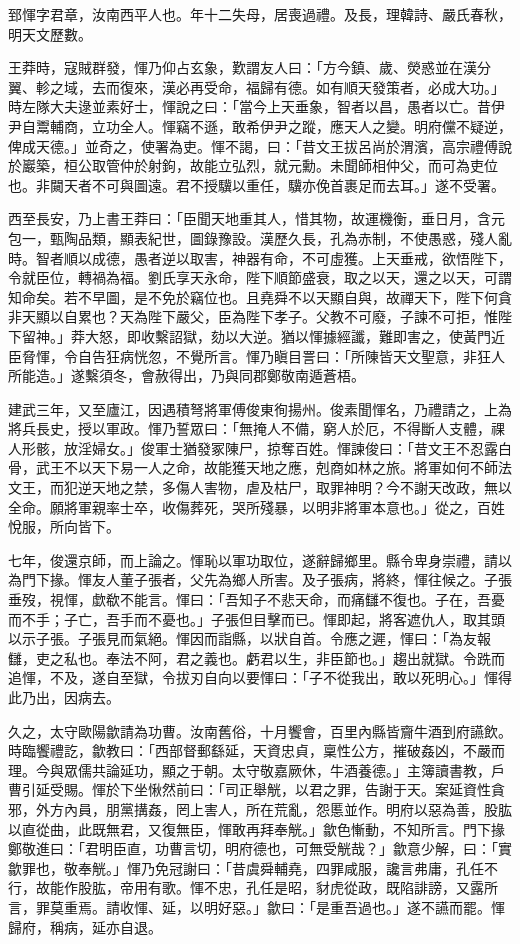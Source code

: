 \begin{pinyinscope}
郅惲字君章，汝南西平人也。年十二失母，居喪過禮。及長，理韓詩、嚴氏春秋，明天文歷數。

王莽時，寇賊群發，惲乃仰占玄象，歎謂友人曰：「方今鎮、歲、熒惑並在漢分翼、軫之域，去而復來，漢必再受命，福歸有德。如有順天發策者，必成大功。」時左隊大夫逯並素好士，惲說之曰：「當今上天垂象，智者以昌，愚者以亡。昔伊尹自鬻輔商，立功全人。惲竊不遜，敢希伊尹之蹤，應天人之變。明府儻不疑逆，俾成天德。」並奇之，使署為吏。惲不謁，曰：「昔文王拔呂尚於渭濱，高宗禮傅說於巖築，桓公取管仲於射鉤，故能立弘烈，就元勳。未聞師相仲父，而可為吏位也。非闚天者不可與圖遠。君不授驥以重任，驥亦俛首裹足而去耳。」遂不受署。

西至長安，乃上書王莽曰：「臣聞天地重其人，惜其物，故運機衡，垂日月，含元包一，甄陶品類，顯表紀世，圖錄豫設。漢歷久長，孔為赤制，不使愚惑，殘人亂時。智者順以成德，愚者逆以取害，神器有命，不可虛獲。上天垂戒，欲悟陛下，令就臣位，轉禍為福。劉氏享天永命，陛下順節盛衰，取之以天，還之以天，可謂知命矣。若不早圖，是不免於竊位也。且堯舜不以天顯自與，故禪天下，陛下何貪非天顯以自累也？天為陛下嚴父，臣為陛下孝子。父教不可廢，子諫不可拒，惟陛下留神。」莽大怒，即收繫詔獄，劾以大逆。猶以惲據經讖，難即害之，使黃門近臣脅惲，令自告狂病恍忽，不覺所言。惲乃瞋目詈曰：「所陳皆天文聖意，非狂人所能造。」遂繫須冬，會赦得出，乃與同郡鄭敬南遁蒼梧。

建武三年，又至廬江，因遇積弩將軍傅俊東徇揚州。俊素聞惲名，乃禮請之，上為將兵長史，授以軍政。惲乃誓眾曰：「無掩人不備，窮人於厄，不得斷人支體，祼人形骸，放淫婦女。」俊軍士猶發冢陳尸，掠奪百姓。惲諫俊曰：「昔文王不忍露白骨，武王不以天下易一人之命，故能獲天地之應，剋商如林之旅。將軍如何不師法文王，而犯逆天地之禁，多傷人害物，虐及枯尸，取罪神明？今不謝天改政，無以全命。願將軍親率士卒，收傷葬死，哭所殘暴，以明非將軍本意也。」從之，百姓悅服，所向皆下。

七年，俊還京師，而上論之。惲恥以軍功取位，遂辭歸鄉里。縣令卑身崇禮，請以為門下掾。惲友人董子張者，父先為鄉人所害。及子張病，將終，惲往候之。子張垂歿，視惲，歔欷不能言。惲曰：「吾知子不悲天命，而痛讎不復也。子在，吾憂而不手；子亡，吾手而不憂也。」子張但目擊而已。惲即起，將客遮仇人，取其頭以示子張。子張見而氣絕。惲因而詣縣，以狀自首。令應之遲，惲曰：「為友報讎，吏之私也。奉法不阿，君之義也。虧君以生，非臣節也。」趨出就獄。令跣而追惲，不及，遂自至獄，令拔刃自向以要惲曰：「子不從我出，敢以死明心。」惲得此乃出，因病去。

久之，太守歐陽歙請為功曹。汝南舊俗，十月饗會，百里內縣皆齎牛酒到府讌飲。時臨饗禮訖，歙教曰：「西部督郵繇延，天資忠貞，稟性公方，摧破姦凶，不嚴而理。今與眾儒共論延功，顯之于朝。太守敬嘉厥休，牛酒養德。」主簿讀書教，戶曹引延受賜。惲於下坐愀然前曰：「司正舉觥，以君之罪，告謝于天。案延資性貪邪，外方內員，朋黨搆姦，罔上害人，所在荒亂，怨慝並作。明府以惡為善，股肱以直從曲，此既無君，又復無臣，惲敢再拜奉觥。」歙色慚動，不知所言。門下掾鄭敬進曰：「君明臣直，功曹言切，明府德也，可無受觥哉？」歙意少解，曰：「實歙罪也，敬奉觥。」惲乃免冠謝曰：「昔虞舜輔堯，四罪咸服，讒言弗庸，孔任不行，故能作股肱，帝用有歌。惲不忠，孔任是昭，豺虎從政，既陷誹謗，又露所言，罪莫重焉。請收惲、延，以明好惡。」歙曰：「是重吾過也。」遂不讌而罷。惲歸府，稱病，延亦自退。


\end{pinyinscope}
